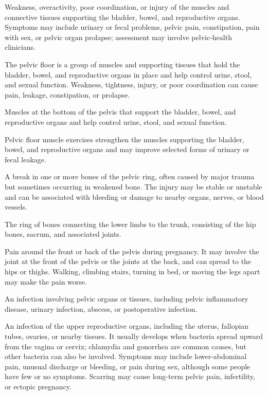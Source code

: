  Weakness, overactivity, poor coordination, or injury of the muscles and connective tissues supporting the bladder,
bowel, and reproductive organs. Symptoms may include urinary or fecal problems, pelvic pain, constipation,
pain with sex, or pelvic organ prolapse; assessment may involve pelvic-health clinicians.

 The pelvic floor is a group of muscles and supporting tissues that hold the bladder, bowel, and reproductive organs in place and help control urine, stool, and sexual function. Weakness, tightness, injury, or poor coordination can cause pain, leakage, constipation, or prolapse.

 Muscles at the bottom of the pelvis that support the bladder, bowel, and reproductive organs and help control urine, stool, and sexual function.

 Pelvic floor muscle exercises strengthen the muscles supporting the bladder, bowel, and reproductive organs and may improve selected forms of urinary or fecal leakage.

 A break in one or more bones of the pelvic ring, often caused by major trauma but sometimes occurring in weakened bone. The injury may be stable or unstable and can be associated with bleeding or damage to nearby organs, nerves, or blood vessels.

 The ring of bones connecting the lower limbs to the trunk, consisting of the hip bones, sacrum, and associated joints.

 Pain around the front or back of the pelvis during pregnancy. It may involve the joint at the front of the pelvis or the joints at the back, and can spread to the hips or thighs. Walking, climbing stairs, turning in bed, or moving the legs apart may make the pain worse.

 An infection involving pelvic organs or tissues, including pelvic inflammatory disease, urinary infection, abscess, or postoperative infection.

 An infection of the upper reproductive organs, including the uterus, fallopian tubes, ovaries, or nearby tissues. It usually develops when bacteria spread upward from the vagina or cervix; chlamydia and gonorrhea are common causes, but other bacteria can also be involved. Symptoms may include lower-abdominal pain, unusual discharge or bleeding, or pain during sex, although some people have few or no symptoms. Scarring may cause long-term pelvic pain, infertility, or ectopic pregnancy.

